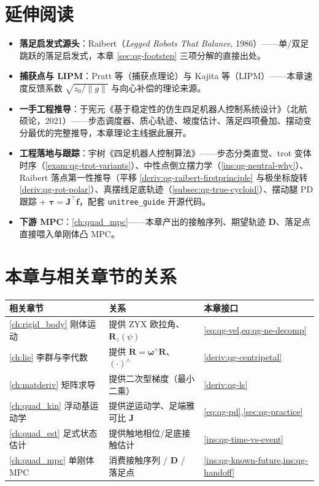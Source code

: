 \section*{延伸阅读}
\begin{itemize}
  \item \textbf{落足启发式源头}：Raibert\cite{raibert1986legged}（\emph{Legged Robots That Balance}, 1986）——单/双足跳跃的落足启发式，本章 \cref{sec:qg-footstep} 三项分解的直接出处。
  \item \textbf{捕获点与 LIPM}：Pratt 等\cite{pratt2006capture}（捕获点理论）与 Kajita 等\cite{kajita2001lipm}（LIPM）——本章速度反馈系数 $\sqrt{z_0/\|g\|}$ 与向心补偿的理论来源。
  \item \textbf{一手工程推导}：于宪元《基于稳定性的仿生四足机器人控制系统设计》\cite{yu2021quadruped}（北航硕论，2021）——步态调度器、质心轨迹、坡度估计、落足四项叠加、摆动变分最优的完整推导，本章理论主线据此展开。
  \item \textbf{工程落地与跟踪}：宇树《四足机器人控制算法》\cite{unitree2023quadruped}——步态分类直觉、trot 变体时序（\cref{exam:qg-trot-variants}）、中性点倒立摆力学（\cref{ins:qg-neutral-why}）、Raibert 落点第一性推导（平移 \cref{deriv:qg-raibert-firstprinciple} 与极坐标旋转 \cref{deriv:qg-rot-polar}）、真摆线足底轨迹（\cref{subsec:qg-true-cycloid}）、摆动腿 PD 跟踪 + $\boldsymbol{\tau}=\mathbf{J}^\top\boldsymbol{f}$，配套 \texttt{unitree\_guide} 开源代码。
  \item \textbf{下游 MPC}：\cref{ch:quad_mpc}——本章产出的接触序列、期望轨迹 $\mathbf{D}$、落足点直接喂入单刚体凸 MPC。
\end{itemize}

\section*{本章与相关章节的关系}
\begin{table}[H]\centering\small
\begin{tabular}{lll}
\toprule
相关章节 & 关系 & 本章接口 \\
\midrule
\cref{ch:rigid_body} 刚体运动 & 提供 ZYX 欧拉角、$\mathbf{R}_z(\psi)$ & \cref{eq:qg-vel,eq:qg-ne-decomp} \\
\cref{ch:lie} 李群与李代数 & 提供 $\dot{\mathbf{R}}=\boldsymbol{\omega}^\wedge\mathbf{R}$、$(\cdot)^\wedge$ & \cref{deriv:qg-centripetal} \\
\cref{ch:matderiv} 矩阵求导 & 提供二次型梯度（最小二乘） & \cref{deriv:qg-ls} \\
\cref{ch:quad_kin} 浮动基运动学 & 提供逆运动学、足端雅可比 $\mathbf{J}$ & \cref{eq:qg-pd},\cref{sec:qg-practice} \\
\cref{ch:quad_est} 足式状态估计 & 提供触地相位/足底接触估计 & \cref{ins:qg-time-vs-event} \\
\cref{ch:quad_mpc} 单刚体 MPC & 消费接触序列 / $\mathbf{D}$ / 落足点 & \cref{ins:qg-known-future,ins:qg-handoff} \\
\bottomrule
\end{tabular}
\end{table}

